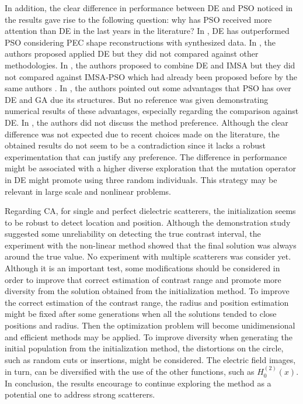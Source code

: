 		In addition, the clear difference in performance between DE and PSO noticed in the results gave rise to the following question: why has PSO received more attention than DE in the last years in the literature? In \citep{rekanos2008shape}, DE has outperformed PSO considering PEC shape reconstructions with synthesized data. In \citep{caorsi2003detection}, the authors proposed applied DE but they did not compared against other methodologies. In \citep{donelli2010differential}, the authors proposed to combine DE and IMSA but they did not compared against IMSA-PSO which had already been proposed before by the same authors \citep{donelli2006integrated}. In \citep{rocca2009evolutionary}, the authors pointed out some advantages that PSO has over DE and GA due its structures. But no reference was given demonstrating numerical results of these advantages, especially regarding the comparison against DE. In \citep{salucci2017multifrequency}, the authors did not discuss the method preference. Although the clear difference was not expected due to recent choices made on the literature, the obtained results do not seem to be a contradiction since it lacks a robust experimentation that can justify any preference. The difference in performance might be associated with a higher diverse exploration that the mutation operator in DE might promote using three random individuals. This strategy may be relevant in large scale and nonlinear problems.
		
		Regarding CA, for single and perfect dielectric scatterers, the initialization seems to be robust to detect location and position. Although the demonstration study suggested some unreliability on detecting the true contrast interval, the experiment with the non-linear method showed that the final solution was always around the true value. No experiment with multiple scatterers was consider yet. Although it is an important test, some modifications should be considered in order to improve that correct estimation of contrast range and promote more diversity from the solution obtained from the initialization method. To improve the correct estimation of the contrast range, the radius and position estimation might be fixed after some generations when all the solutions tended to close positions and radius. Then the optimization problem will become unidimensional and efficient methods may be applied. To improve diversity when generating the initial population from the initialization method, the distortions on the circle, such as random cuts or insertions, might be considered. The electric field images, in turn, can be diversified with the use of the other functions, such as $H^{(2)}_0(x)$. In conclusion, the results encourage to continue exploring the method as a potential one to address strong scatterers.
		
